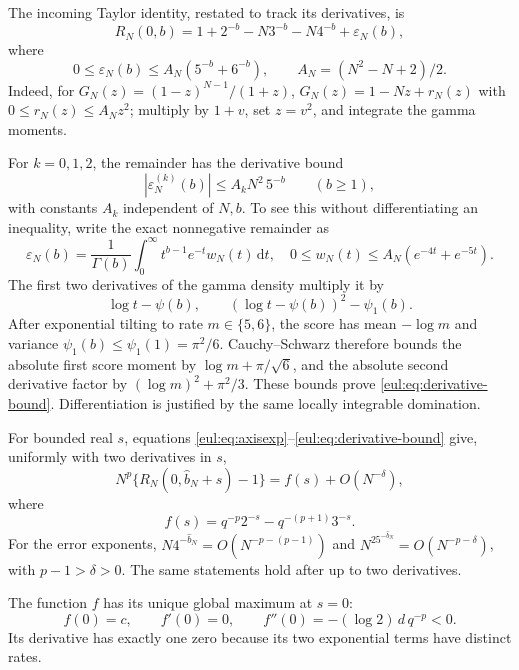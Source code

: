\documentclass[11pt]{article}
\numberwithin{equation}{section}
\theoremstyle{definition}
\theoremstyle{remark}
\newcommand{\dd}{\,\mathrm d}
\begin{document}
The incoming Taylor identity, restated to track its derivatives, is
\begin{equation}\label{eul:eq:axisexp}
 R_N(0,b)=1+2^{-b}-N3^{-b}-N4^{-b}+\varepsilon_N(b),
\end{equation}
where
\begin{equation}\label{eul:eq:axisrem}
 0\leq\varepsilon_N(b)\leq
 A_N(5^{-b}+6^{-b}),\qquad A_N=(N^2-N+2)/2.
\end{equation}
Indeed, for $G_N(z)=(1-z)^{N-1}/(1+z)$,
$G_N(z)=1-Nz+r_N(z)$ with
$0\leq r_N(z)\leq A_Nz^2$; multiply by $1+v$, set $z=v^2$, and
integrate the gamma moments.

For $k=0,1,2$, the remainder has the derivative bound
\begin{equation}\label{eul:eq:derivative-bound}
 |\varepsilon_N^{(k)}(b)|\leq A_k N^2\,5^{-b}
 \qquad(b\geq1),
\end{equation}
with constants $A_k$ independent of $N,b$.
To see this without differentiating an inequality, write the exact
nonnegative remainder as
\[
 \varepsilon_N(b)=\frac1{\Gamma(b)}\int_0^\infty
 t^{b-1}e^{-t}w_N(t)\dd t,
 \quad 0\leq w_N(t)\leq A_N(e^{-4t}+e^{-5t}).
\]
The first two derivatives of the gamma density multiply it by
\[
 \log t-\psi(b),\qquad
 (\log t-\psi(b))^2-\psi_1(b).
\]
After exponential tilting to rate $m\in\{5,6\}$, the score has
mean $-\log m$ and variance $\psi_1(b)\leq\psi_1(1)=\pi^2/6$.
Cauchy--Schwarz therefore bounds the absolute first score moment by
$\log m+\pi/\sqrt6$, and the absolute second derivative factor by
$(\log m)^2+\pi^2/3$.  These bounds prove
\eqref{eul:eq:derivative-bound}.  Differentiation is justified by the same
locally integrable domination.

For bounded real $s$, equations \eqref{eul:eq:axisexp}--\eqref{eul:eq:derivative-bound}
give, uniformly with two derivatives in $s$,
\begin{equation}\label{eul:eq:C2profile}
 N^p\{R_N(0,\widehat b_N+s)-1\}
   =f(s)+O(N^{-\delta}),
\end{equation}
where
\[
 f(s)=q^{-p}2^{-s}-q^{-(p+1)}3^{-s}.
\]
For the error exponents, $N4^{-\widehat b_N}=O(N^{-p-(p-1)})$
and $N^25^{-\widehat b_N}=O(N^{-p-\delta})$,
with $p-1>\delta>0$.  The same statements hold after up to two
derivatives.

The function $f$ has its unique global maximum at $s=0$:
\[
 f(0)=c,\qquad f'(0)=0,\qquad
 f''(0)=-(\log2)\,d\,q^{-p}<0.
\]
Its derivative has exactly one zero because its two exponential terms
have distinct rates.
\end{document}
